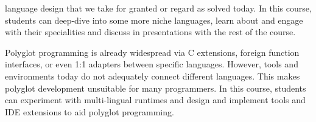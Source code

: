 \documentclass[11pt,a4paper,sans]{moderncv} %
\begin{document}
\begin{description}
  language design that we take for granted or regard as solved today. In this
  course, students can deep-dive into some more niche languages, learn about and
  engage with their specialities and discuss in presentations with the rest of
  the course.
\item[Polyglot Programming] Polyglot programming is already widespread via C
  extensions, foreign function interfaces, or even 1:1 adapters between specific
  languages. However, tools and environments today do not adequately connect
  different languages. This makes polyglot development unsuitable for many
  programmers. In this course, students can experiment with multi-lingual
  runtimes and design and implement tools and IDE extensions to aid polyglot
  programming.
\end{description}

\clearpage
\thispagestyle{plain}
\vspace*{\fill}
\parbox[t]{\hintscolumnwidth}{\strut\raggedleft\raisebox{\baseletterheight}{\color{color1}\rule{\hintscolumnwidth}{0.95ex}}}
\hspace{\separatorcolumnwidth}
\parbox[t]{\maincolumnwidth}{\strut{}}\\[4\parskip]
\label{sec:certs}
\vspace{\fill}
\newpage

\label{sec:phd}


\label{sec:msc}


\label{sec:bsc}


\label{sec:evaluation}
\thispagestyle{plain}
\vspace*{\fill}
\parbox[t]{\hintscolumnwidth}{\strut\raggedleft\raisebox{\baseletterheight}{\color{color1}\rule{\hintscolumnwidth}{0.95ex}}}
\hspace{\separatorcolumnwidth}
\parbox[t]{\maincolumnwidth}{\strut{}}
\vspace{\fill}
\newpage



\clearpage
{}
\label{sec:selected-publications}
\thispagestyle{plain} \vspace*{\fill}
\parbox[t]{\hintscolumnwidth}{\strut\raggedleft\raisebox{\baseletterheight}{\color{color1}\rule{\hintscolumnwidth}{0.95ex}}}
\hspace{\separatorcolumnwidth}
\parbox[t]{\maincolumnwidth}{\strut{}}\\[4\parskip]
\end{document}
